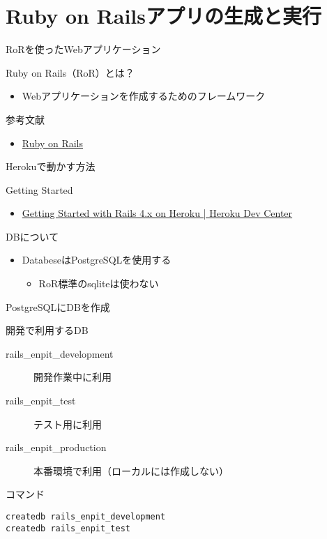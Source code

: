 \documentclass[t, aspectratio=169]{beamer}
\begin{document}
\section{Ruby on Railsアプリの生成と実行}
\label{sec-6-1}
\begin{frame}[label=sec-6-1-1]{RoRを使ったWebアプリケーション}
\begin{block}{Ruby on Rails（RoR）とは？}
\begin{itemize}
\item Webアプリケーションを作成するためのフレームワーク
\end{itemize}
\end{block}

\begin{block}{参考文献}
\begin{itemize}
\item \href{http://rubyonrails.org/}{Ruby on Rails}
\end{itemize}
\end{block}
\end{frame}
\begin{frame}[label=sec-6-1-2]{Herokuで動かす方法}
\begin{block}{Getting Started}
\begin{itemize}
\item \href{https://devcenter.heroku.com/articles/getting-started-with-rails4}{Getting Started with Rails 4.x on Heroku | Heroku Dev Center}
\end{itemize}
\end{block}
\begin{block}{DBについて}
\begin{itemize}
\item DatabeseはPostgreSQLを使用する
\begin{itemize}
\item RoR標準のsqliteは使わない
\end{itemize}
\end{itemize}
\end{block}
\end{frame}
\begin{frame}[fragile,label=sec-6-1-3]{PostgreSQLにDBを作成}
 \begin{block}{開発で利用するDB}
\begin{description}
\item[{rails\_enpit\_development}] 開発作業中に利用
\item[{rails\_enpit\_test}] テスト用に利用
\item[{rails\_enpit\_production}] 本番環境で利用（ローカルには作成しない）
\end{description}
\end{block}

\begin{block}{コマンド}
\begin{verbatim}
createdb rails_enpit_development
createdb rails_enpit_test
\end{verbatim}
\end{block}
\end{frame}
\end{document}
